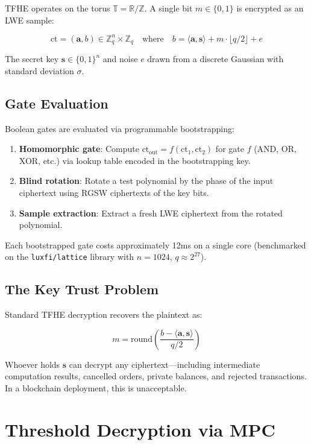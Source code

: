 \documentclass[11pt,a4paper]{article}
\begin{document}
TFHE operates on the torus $\mathbb{T} = \mathbb{R}/\mathbb{Z}$. A single bit $m \in \{0,1\}$ is encrypted as an LWE sample:

$$\text{ct} = (\mathbf{a}, b) \in \mathbb{Z}_q^n \times \mathbb{Z}_q \quad \text{where} \quad b = \langle \mathbf{a}, \mathbf{s} \rangle + m \cdot \lfloor q/2 \rfloor + e$$

The secret key $\mathbf{s} \in \{0,1\}^n$ and noise $e$ drawn from a discrete Gaussian with standard deviation $\sigma$.

\subsection{Gate Evaluation}

Boolean gates are evaluated via programmable bootstrapping:

\begin{enumerate}[leftmargin=2em]
\item \textbf{Homomorphic gate}: Compute $\text{ct}_{\text{out}} = f(\text{ct}_1, \text{ct}_2)$ for gate $f$ (AND, OR, XOR, etc.) via lookup table encoded in the bootstrapping key.
\item \textbf{Blind rotation}: Rotate a test polynomial by the phase of the input ciphertext using RGSW ciphertexts of the key bits.
\item \textbf{Sample extraction}: Extract a fresh LWE ciphertext from the rotated polynomial.
\end{enumerate}

Each bootstrapped gate costs approximately 12ms on a single core (benchmarked on the \texttt{luxfi/lattice} library with $n=1024$, $q \approx 2^{27}$).

\subsection{The Key Trust Problem}

Standard TFHE decryption recovers the plaintext as:

$$m = \text{round}\left(\frac{b - \langle \mathbf{a}, \mathbf{s} \rangle}{q/2}\right)$$

Whoever holds $\mathbf{s}$ can decrypt any ciphertext---including intermediate computation results, cancelled orders, private balances, and rejected transactions. In a blockchain deployment, this is unacceptable.

\section{Threshold Decryption via MPC}
\end{document}
